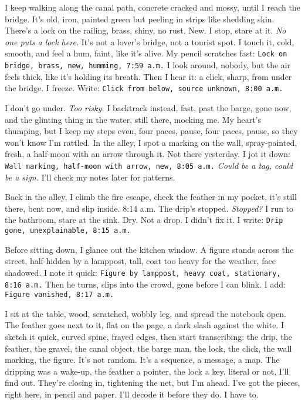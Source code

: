 \documentclass[12pt]{article}
\newcommand{\note}[1]{\texttt{#1}}
\begin{document}
I keep walking along the canal path, concrete cracked and mossy, until I reach the bridge. It’s old, iron, painted green but peeling in strips like shedding skin. There’s a lock on the railing, brass, shiny, no rust. New. I stop, stare at it. \textit{No one puts a lock here.} It’s not a lover’s bridge, not a tourist spot. I touch it, cold, smooth, and feel a hum, faint, like it’s alive. My pencil scratches fast: \note{Lock on bridge, brass, new, humming, 7:59 a.m.} I look around, nobody, but the air feels thick, like it’s holding its breath. Then I hear it: a click, sharp, from under the bridge. I freeze. Write: \note{Click from below, source unknown, 8:00 a.m.}

I don’t go under. \textit{Too risky.} I backtrack instead, fast, past the barge, gone now, and the glinting thing in the water, still there, mocking me. My heart’s thumping, but I keep my steps even, four paces, pause, four paces, pause, so they won’t know I’m rattled. In the alley, I spot a marking on the wall, spray-painted, fresh, a half-moon with an arrow through it. Not there yesterday. I jot it down: \note{Wall marking, half-moon with arrow, new, 8:05 a.m.} \textit{Could be a tag, could be a sign.} I’ll check my notes later for patterns.

Back in the alley, I climb the fire escape, check the feather in my pocket, it’s still there, bent now, and slip inside. 8:14 a.m. The drip’s stopped. \textit{Stopped?} I run to the bathroom, stare at the sink. Dry. Not a drop. I didn’t fix it. I write: \note{Drip gone, unexplainable, 8:15 a.m.}

Before sitting down, I glance out the kitchen window. A figure stands across the street, half-hidden by a lamppost, tall, coat too heavy for the weather, face shadowed. I note it quick: \note{Figure by lamppost, heavy coat, stationary, 8:16 a.m.} Then he turns, slips into the crowd, gone before I can blink. I add: \note{Figure vanished, 8:17 a.m.}

I sit at the table, wood, scratched, wobbly leg, and spread the notebook open. The feather goes next to it, flat on the page, a dark slash against the white. I sketch it quick, curved spine, frayed edges, then start transcribing: the drip, the feather, the gravel, the canal object, the barge man, the lock, the click, the wall marking, the figure. It’s not random. It’s a sequence, a message, a map. The dripping was a wake-up, the feather a pointer, the lock a key, literal or not, I’ll find out. They’re closing in, tightening the net, but I’m ahead. I’ve got the pieces, right here, in pencil and paper. I’ll decode it before they do. I have to.
\end{document}
